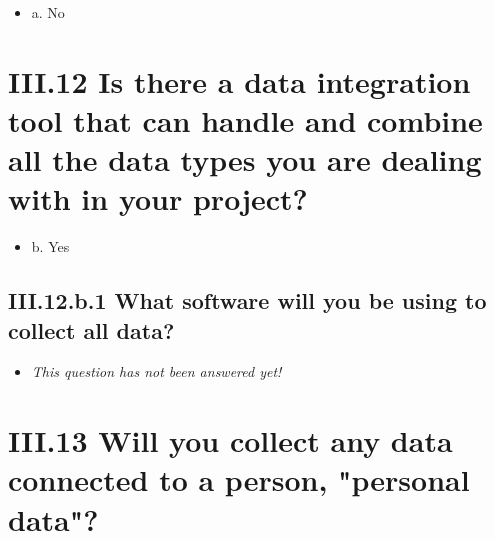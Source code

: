 \documentclass[a4paper,12pt]{report}
\begin{document}
\begin{itemize}
  \item[\CheckmarkBold] a. No
\end{itemize}






\section*{\protect\textcolor{colorSecId}{III.12} Is there a data integration tool that can handle and combine all the data types you are dealing with in your project?}

\label{b1df3c74-0b1f-4574-81c4-4cc2d780c1af.ab4b3f39-dfab-45a5-9489-2d46ceacbb73}






\begin{itemize}
  \item[\CheckmarkBold] b. Yes
\end{itemize}




\subsection*{\protect\textcolor{colorSecId}{III.12.b.1} What software will you be using to collect all data?}

\label{b1df3c74-0b1f-4574-81c4-4cc2d780c1af.ab4b3f39-dfab-45a5-9489-2d46ceacbb73.b24b7cbe-2209-47e9-87d6-401fbfb3cdec.2e394765-d87d-4c1e-9f90-d8d2a06826e3}






\begin{itemize}
  \item[\XSolidBrush] \textit{This question has not been answered yet!}
\end{itemize}
  


\section*{\protect\textcolor{colorSecId}{III.13} Will you collect any data connected to a person, "personal data"?}
\end{document}
